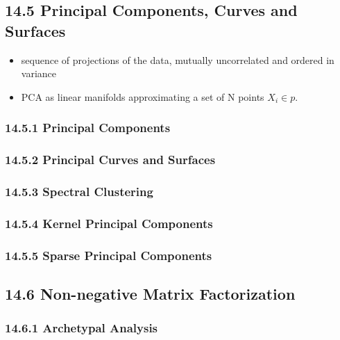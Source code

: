 \documentclass[11pt]{article}
\providecommand{\tightlist}{%
      \setlength{\itemsep}{0pt}\setlength{\parskip}{0pt}}
\begin{document}
\subsection{14.5 Principal Components, Curves and
Surfaces}\label{principal-components-curves-and-surfaces}

\begin{itemize}
\tightlist
\item
  sequence of projections of the data, mutually uncorrelated and ordered
  in variance
\item
  PCA as linear manifolds approximating a set of N points
  \(X_{i} \in p\).
\end{itemize}

\subsubsection{14.5.1 Principal Components}\label{principal-components}

\subsubsection{14.5.2 Principal Curves and
Surfaces}\label{principal-curves-and-surfaces}

\subsubsection{14.5.3 Spectral Clustering}\label{spectral-clustering}

\subsubsection{14.5.4 Kernel Principal
Components}\label{kernel-principal-components}

\subsubsection{14.5.5 Sparse Principal
Components}\label{sparse-principal-components}

\subsection{14.6 Non-negative Matrix
Factorization}\label{non-negative-matrix-factorization}

\subsubsection{14.6.1 Archetypal Analysis}\label{archetypal-analysis}
\end{document}
